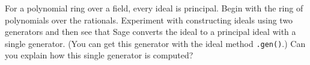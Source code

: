 \begin{sageverbatim}\end{sageverbatim}
%
%
For a polynomial ring over a field, every ideal is principal.  Begin with the ring of polynomials over the rationals.  Experiment with constructing ideals using two generators and then see that Sage converts the ideal to a principal ideal with a single generator.  (You can get this generator with the ideal method \verb?.gen()?.)  Can you explain how this single generator is computed?
\begin{sageverbatim}\end{sageverbatim}
